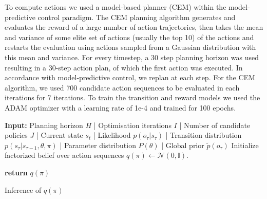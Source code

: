 To compute actions we used a model-based planner (CEM) \citep{rubinstein1997optimization} within the model-predictive control paradigm. The CEM planning algorithm generates and evaluates the reward of a large number of action trajectories, then takes the mean and variance of some elite set of actions (usually the top 10) of the actions and restarts the evaluation using actions sampled from a Gaussian distribution with this mean and variance. For every timestep, a 30 step planning horizon was used resulting in a 30-step action plan, of which the first action was executed. In accordance with model-predictive control, we replan at each step. For the CEM algorithm, we used 700 candidate action sequences to be evaluated in each iterations for 7 iterations. To train the transition and reward models we used the ADAM optimizer with a learning rate of 1e-4 and trained for 100 epochs.

\begin{algorithm}[H]
\label{algo:exps}
\SetAlgoLined
   \DontPrintSemicolon
   \textbf{Input:} Planning horizon $H$ | Optimisation iterations $I$ | Number of candidate policies $J$ | Current state $s_t$ | Likelihood $p(o_\tau|s_\tau)$ |  Transition distribution $p(s_\tau|s_{\tau-1}, \theta, \pi)$ | Parameter distribution $P(\theta)$ | Global prior $\tilde{p}(o_\tau)$
   \BlankLine
   Initialize factorized belief over action sequences $q(\pi) \leftarrow \mathcal{N}(0,\mathbb{I})$.
   
\textbf{return} $q(\pi)$
\caption{Inference of $q(\pi)$}
\end{algorithm}

